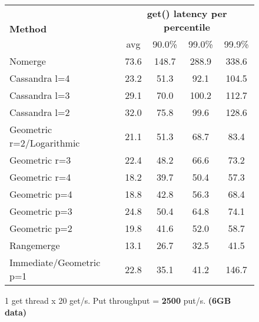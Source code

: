 \documentclass[11pt]{article}
\begin{document}
\begin{figure}[ht]
\begin{center}
\begin{tabular}{|l|c|c|c|c|}
\hline
\multirow{2}{*}{\textbf{Method}} & \multicolumn{4}{c|}{\textbf{get() latency per percentile}} \\
                                 & avg & 90.0\% & 99.0\% & 99.9\% \\
\hline
\hline
Nomerge                   & 73.6 & 148.7 & 288.9 & 338.6 \\
\hline
Cassandra l=4             & 23.2 & 51.3 &  92.1 & 104.5 \\
\hline
Cassandra l=3             & 29.1 & 70.0 & 100.2 & 112.7 \\
\hline
Cassandra l=2             & 32.0 & 75.8 &  99.6 & 128.6 \\
\hline
Geometric r=2/Logarithmic & 21.1 & 51.3 &  68.7 &  83.4 \\
\hline
Geometric r=3             & 22.4 & 48.2 &  66.6 &  73.2 \\
\hline
Geometric r=4             & 18.2 & 39.7 &  50.4 &  57.3 \\
\hline
Geometric p=4             & 18.8 & 42.8 &  56.3 &  68.4 \\
\hline
Geometric p=3             & 24.8 & 50.4 &  64.8 &  74.1 \\
\hline
Geometric p=2             & 19.8 & 41.6 &  52.0 &  58.7 \\
\hline
Rangemerge                & 13.1 & 26.7 &  32.5 &  41.5 \\
\hline
Immediate/Geometric p=1   & 22.8 & 35.1 &  41.2 & 146.7 \\
\hline
\end{tabular} 
\caption{1 get thread x 20 get/s. Put throughput = \textbf{2500} put/s. \textbf{(6GB data)}}
\end{center}
\end{figure}
\end{document}
